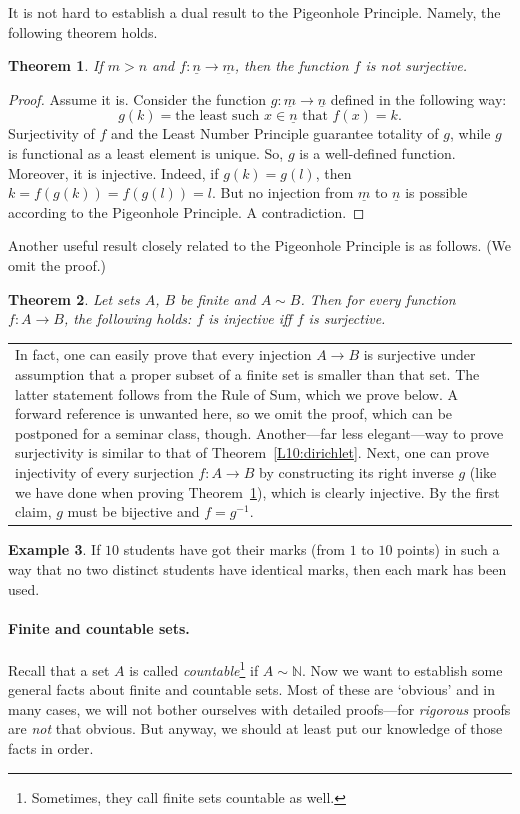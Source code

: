 \documentclass[12pt,notitlepage]{article}
\theoremstyle{plain}
\newtheorem{thm}{Theorem}[section]
\theoremstyle{definition}
\newtheorem{exm}[thm]{Example}
\theoremstyle{plain}
\newcommand{\N}{\mathbb{N}}
\newcommand{\ul}[1]{\underline{#1}}
\newcommand{\1}{\mathbf{1}}
\newcommand{\0}{\mathbf{0}}
\newcommand{\mcomm}[1]{
\medskip\noindent\begin{tabular}{| l}
\parbox{0.99\textwidth}{{\small
#1 }}\end{tabular}
\smallskip}
\begin{document}
It is not hard to establish a dual result to the Pigeonhole Principle. Namely, the following theorem holds.
\begin{thm}\label{L10:pigeon_dual}
If $m > n$ and $f\colon \ul{n} \to \ul{m}$, then the function $f$ is not surjective.
\end{thm}
\begin{proof}
Assume it is. Consider the function $g\colon \ul{m} \to \ul{n}$ defined in the following way:
$$g(k) = \mbox{the least such $x \in \ul{n}$ that } f(x) = k.$$
Surjectivity of $f$ and the Least Number Principle guarantee totality of $g$, while $g$ is functional as a least element is unique. So, $g$ is a well-defined function. Moreover, it is injective. Indeed, if $g(k) = g(l)$, then $k = f(g(k)) = f(g(l)) = l$. But no injection from $\ul{m}$ to $\ul{n}$ is possible according to the Pigeonhole Principle. A contradiction.
\end{proof}

Another useful result closely related to the Pigeonhole Principle is as follows. (We omit the proof.)
\begin{thm}\label{L10:fin_sur_in}
Let sets $A$, $B$ be finite and $A \sim B$. Then for every function $f\colon A \to B$, the following holds: $f$ is injective iff $f$ is surjective.
\end{thm}
\mcomm{In fact, one can easily prove that every injection $A \to B$ is surjective under assumption that a proper subset of a finite set is smaller than that set. The latter statement follows from the  Rule of Sum, which we prove below. A forward reference is unwanted here, so we omit the proof, which can be postponed for a seminar class, though. Another---far less elegant---way to prove surjectivity is similar to that of Theorem~\ref{L10:dirichlet}. Next, one can prove injectivity of every surjection $f\colon A \to B$ by constructing its right inverse $g$ (like we have done when proving Theorem~\ref{L10:pigeon_dual}), which is clearly injective. By the first claim, $g$ must be bijective and $f = g^{-1}$.}
\begin{exm}
If $10$ students have got their marks (from $1$ to $10$ points) in such a way that no two distinct students have identical marks, then each mark has been used.
\end{exm}

\paragraph{Finite and countable sets.} Recall that a set $A$ is  called \emph{countable}\footnote{Sometimes, they call finite sets countable as well.} if $A \sim \N$. Now we want to establish some general facts about finite and countable sets. Most of these are `obvious' and in many cases, we will not bother ourselves with detailed proofs---for \emph{rigorous} proofs are \emph{not} that obvious. But anyway, we should at least put our knowledge of those facts in order.
\end{document}
